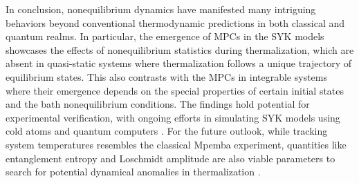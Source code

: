 \documentclass[prl,superscriptaddress,notitlepage,showpacs,twocolumn]{revtex4-2}
\begin{document}


In conclusion, nonequilibrium dynamics have manifested many intriguing behaviors beyond conventional thermodynamic predictions in both classical and quantum realms. In particular, the emergence of MPCs in the SYK models showcases the effects of nonequilibrium statistics during thermalization, which are absent in quasi-static systems where thermalization follows a unique trajectory of equilibrium states. This also contrasts with the  MPCs in integrable systems where their emergence depends on the special properties of certain initial states and the bath nonequilibrium conditions. The findings hold potential for experimental verification, with ongoing efforts in simulating SYK models using cold atoms and quantum computers \cite{pikulin2017black,danshita2017creating,luo2019quantum}. For the future outlook, while tracking system temperatures resembles the classical Mpemba experiment, quantities like entanglement entropy and Loschmidt amplitude are also viable parameters to search for potential dynamical anomalies in thermalization \cite{kawabata2023dynamical,chatterjee2023quantum,wang2024mpemba}.  
\end{document}
